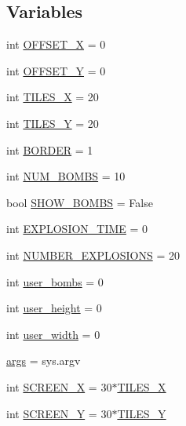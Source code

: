 \subsection*{Variables}
\begin{DoxyCompactItemize}
\item 
int \mbox{\hyperlink{namespaceminesweeper_a6a4ccfa26ab8b9aac5722b057e9eddbd}{O\+F\+F\+S\+E\+T\+\_\+X}} = 0
\item 
int \mbox{\hyperlink{namespaceminesweeper_aa2fd039a9a652a54874cec33ba8e157b}{O\+F\+F\+S\+E\+T\+\_\+Y}} = 0
\item 
int \mbox{\hyperlink{namespaceminesweeper_ac9707e38bc10ae8def8674e284754df2}{T\+I\+L\+E\+S\+\_\+X}} = 20
\item 
int \mbox{\hyperlink{namespaceminesweeper_a57ad9d0736fe592d6a6fa58ef8e6ab72}{T\+I\+L\+E\+S\+\_\+Y}} = 20
\item 
int \mbox{\hyperlink{namespaceminesweeper_a3324cf634218bea0300a16ea394866bf}{B\+O\+R\+D\+ER}} = 1
\item 
int \mbox{\hyperlink{namespaceminesweeper_aec391623def4c70333b6f270b23e4dcd}{N\+U\+M\+\_\+\+B\+O\+M\+BS}} = 10
\item 
bool \mbox{\hyperlink{namespaceminesweeper_a019b9bd716098a1e8bad7266522f1ec8}{S\+H\+O\+W\+\_\+\+B\+O\+M\+BS}} = False
\item 
int \mbox{\hyperlink{namespaceminesweeper_a910d256576fdcee42c40cf536a4d7418}{E\+X\+P\+L\+O\+S\+I\+O\+N\+\_\+\+T\+I\+ME}} = 0
\item 
int \mbox{\hyperlink{namespaceminesweeper_a2574014561fe84a324ee63a238ac10a0}{N\+U\+M\+B\+E\+R\+\_\+\+E\+X\+P\+L\+O\+S\+I\+O\+NS}} = 20
\item 
int \mbox{\hyperlink{namespaceminesweeper_a4c153932676a022ab73ea0beb16fe3fd}{user\+\_\+bombs}} = 0
\item 
int \mbox{\hyperlink{namespaceminesweeper_af71428b338d75d1d47f21a15c68b0548}{user\+\_\+height}} = 0
\item 
int \mbox{\hyperlink{namespaceminesweeper_aee2b107d1e606d9caedea2c6fc790f64}{user\+\_\+width}} = 0
\item 
\mbox{\hyperlink{namespaceminesweeper_a85659bd28c6c730dfc76bd09939251e6}{args}} = sys.\+argv
\item 
int \mbox{\hyperlink{namespaceminesweeper_a1844cce3a8aa0b80dce337b5f39dedfb}{S\+C\+R\+E\+E\+N\+\_\+X}} = 30$\ast$\mbox{\hyperlink{namespaceminesweeper_ac9707e38bc10ae8def8674e284754df2}{T\+I\+L\+E\+S\+\_\+X}}
\item 
int \mbox{\hyperlink{namespaceminesweeper_ab648a812026dc7c97d7267459db82451}{S\+C\+R\+E\+E\+N\+\_\+Y}} = 30$\ast$\mbox{\hyperlink{namespaceminesweeper_a57ad9d0736fe592d6a6fa58ef8e6ab72}{T\+I\+L\+E\+S\+\_\+Y}}

\end{DoxyCompactItemize}
